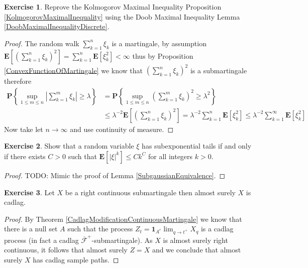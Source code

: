\documentclass{amsbook}
\theoremstyle{definition}
\newtheorem{xca}{Exercise}
\theoremstyle{remark}
\newcommand{\expectation}[1]{\textbf{E}\left[#1\right]}
\newcommand{\probability}[1]{\textbf{P}\left \{#1 \right \}}
\newcommand{\characteristic}[1]{\textbf{1}_{#1}}
\newcommand{\abs}[1]{\left \vert #1 \right \vert}
\begin{document}
\begin{xca}Reprove the Kolmogorov Maximal Inequality Proposition
  \ref {KolmogorovMaximalInequality} using the Doob Maximal Inequality Lemma \ref{DoobMaximalInequalityDiscrete}.
\end{xca}
\begin{proof}
The random walk $\sum_{k=1}^n \xi_k$ is a martingale, by assumption $\expectation{\left(\sum_{k=1}^n \xi_k \right )^2} = \sum_{k=1}^n \expectation{\xi_k^2} < \infty$ thus by Proposition \ref{ConvexFunctionOfMartingale} we know that $\left( \sum_{k=1}^n \xi_k \right)^2$ is a submartingale therefore
\begin{align*}
\probability{\sup_{1 \leq m \leq n} \abs{\sum_{k=1}^m \xi_k } \geq \lambda} &= \probability{\sup_{1 \leq m \leq n} \left(\sum_{k=1}^m \xi_k \right)^2 \geq \lambda^2} \\
&\leq \lambda^{-2} \expectation{\left(\sum_{k=1}^n \xi_k \right)^2} = \lambda^{-2} \sum_{k=1}^n \expectation{ \xi_k^2} 
\leq  \lambda^{-2} \sum_{k=1}^\infty \expectation{ \xi_k^2} 
\end{align*}
Now take let $n \to \infty$ and use continuity of measure.
\end{proof}

\begin{xca}Show that a random variable $\xi$ has subexponential tails
  if and only if there exists $C > 0$ such that
  $\expectation{\abs{\xi}^k} \leq C k^C$ for all integers $k > 0$.
\end{xca}
\begin{proof}
TODO: Mimic the proof of Lemma \ref{SubgaussianEquivalence}.
\end{proof}

\begin{xca}Let $X$ be a right continuous
  submartingale then almost surely $X$ is cadlag.
\end{xca}
\begin{proof}
By Theorem \ref{CadlagModificationContinuousMartingale} we know that
there is a null set $A$ such that
the process $Z_t = \characteristic{A^c} \lim_{q \to t^+}X_q$ is a
cadlag process (in fact a cadlag $\overline{\mathcal{F}}^+$-submartingale).
As $X$ is almost surely right continuous, it follows that almost surely $Z = X$ and we
conclude that almost surely $X$ has cadlag sample paths.
\end{proof}
\end{document}
